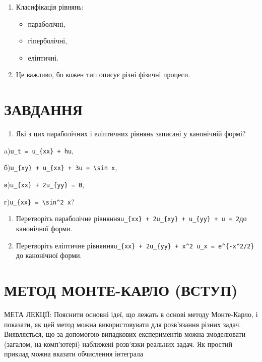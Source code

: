 \documentclass[
  ukrainian,
]{article}
\providecommand{\tightlist}{%
  \setlength{\itemsep}{0pt}\setlength{\parskip}{0pt}}
\begin{document}
\begin{enumerate}
\def\labelenumi{\arabic{enumi}.}
\tightlist
\item
  Класифікація рівнянь:

  \begin{itemize}
  \tightlist
  \item
    параболічні,
  \item
    гіперболічні,
  \item
    еліптичні.
  \end{itemize}
\item
  Це важливо, бо кожен тип описує різні фізичні процеси.
\end{enumerate}

\section{ЗАВДАННЯ}\label{ux437ux430ux432ux434ux430ux43dux43dux44f-7}

\begin{enumerate}
\def\labelenumi{\arabic{enumi}.}
\tightlist
\item
  Які з цих параболічних і еліптичних рівнянь записані у канонічній
  формі?
\end{enumerate}

a)\texttt{u\_t\ =\ u\_\{xx\}\ +\ hu},

б)\texttt{u\_\{xy\}\ +\ u\_\{xx\}\ +\ 3u\ =\ \textbackslash{}sin\ x},

в)\texttt{u\_\{xx\}\ +\ 2u\_\{yy\}\ =\ 0},

г)\texttt{u\_\{xx\}\ =\ \textbackslash{}sin\^{}2\ x}?

\begin{enumerate}
\def\labelenumi{\arabic{enumi}.}
\setcounter{enumi}{1}
\item
  Перетворіть параболічне
  рівняння\texttt{u\_\{xx\}\ +\ 2u\_\{xy\}\ +\ u\_\{yy\}\ +\ u\ =\ 2}до
  канонічної форми.
\item
  Перетворіть еліптичне
  рівняння\texttt{u\_\{xx\}\ +\ 2u\_\{yy\}\ +\ x\^{}2\ u\_x\ =\ e\^{}\{-x\^{}2/2\}}до
  канонічної форми.
\end{enumerate}

\section{МЕТОД МОНТЕ-КАРЛО
(ВСТУП)}\label{ux43cux435ux442ux43eux434-ux43cux43eux43dux442ux435-ux43aux430ux440ux43bux43e-ux432ux441ux442ux443ux43f}

МЕТА ЛЕКЦІЇ: Пояснити основні ідеї, що лежать в основі методу
Монте-Карло, і показати, як цей метод можна використовувати для
розв'язання різних задач. Виявляється, що за допомогою випадкових
експериментів можна змоделювати (загалом, на комп'ютері) наближені
розв'язки реальних задач. Як простий приклад можна вказати обчислення
інтеграла
\end{document}
